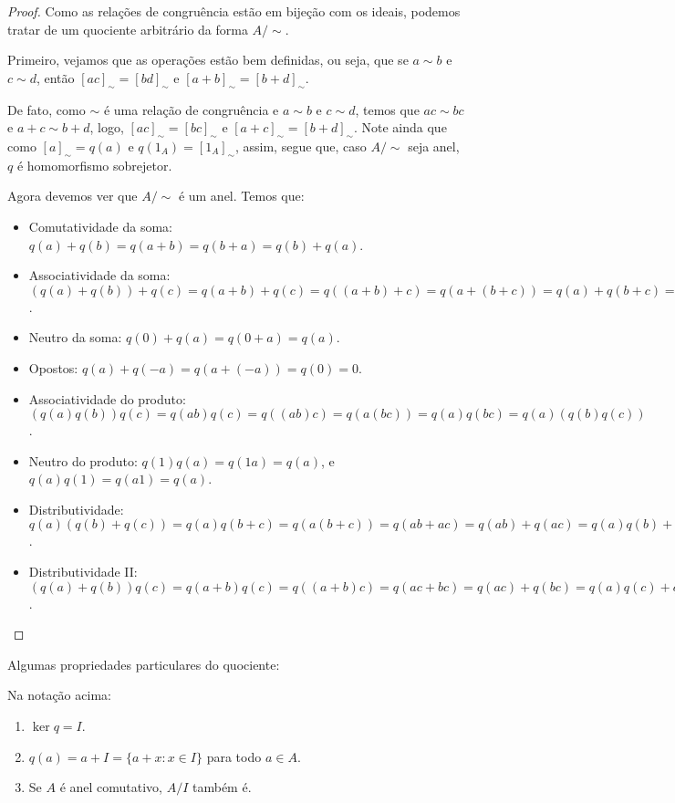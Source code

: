 \begin{proof}
    Como as relações de congruência estão em bijeção com os ideais, podemos tratar de um quociente arbitrário da forma $A/\sim$.
    
    Primeiro, vejamos que as operações estão bem definidas, ou seja, que se $a\sim b$ e $c\sim d$, então $[ac]_\sim=[bd]_\sim$ e $[a+b]_\sim=[b+d]_\sim$.
    
    De fato, como $\sim$ é uma relação de congruência e $a\sim b$ e $c\sim d$, temos que $ac\sim bc$ e $a+c\sim b+d$, logo, $[ac]_\sim=[bc]_\sim$ e $[a+c]_\sim=[b+d]_\sim$. Note ainda que como $[a]_\sim=q(a)$ e $q(1_A)=[1_A]_\sim$, assim, segue que, caso $A/\sim$ seja anel, $q$ é homomorfismo sobrejetor.

    Agora devemos ver que $A/\sim$ é um anel. Temos que:

    \begin{itemize}
        \item Comutatividade da soma: $q(a)+q(b)=q(a+b)=q(b+a)=q(b)+q(a)$.
        \item Associatividade da soma: $(q(a)+q(b))+q(c)=q(a+b)+q(c)=q((a+b)+c)=q(a+(b+c))=q(a)+q(b+c)=q(a)+(q(b)+q(c))$.
        \item Neutro da soma: $q(0)+q(a)=q(0+a)=q(a)$.
        \item Opostos: $q(a)+q(-a)=q(a+(-a))=q(0)=0$.
        \item Associatividade do produto:$(q(a)q(b))q(c)=q(ab)q(c)=q((ab)c)=q(a(bc))=q(a)q(bc)=q(a)(q(b)q(c))$.
        \item Neutro do produto: $q(1)q(a)=q(1a)=q(a)$, e $q(a)q(1)=q(a1)=q(a)$.
        \item Distributividade: $q(a)(q(b)+q(c))=q(a)q(b+c)=q(a(b+c))=q(ab+ac)=q(ab)+q(ac)=q(a)q(b)+q(a)q(c)$.
        \item Distributividade II: $(q(a)+q(b))q(c)=q(a+b)q(c)=q((a+b)c)=q(ac+bc)=q(ac)+q(bc)=q(a)q(c)+q(b)q(c)$.
    \end{itemize}
        
\end{proof}

Algumas propriedades particulares do quociente:

\begin{lemma}
    Na notação acima:
    \begin{enumerate}[label=\alph*)]
        \item $\ker q = I$. \label{lemma:propriedadesQuociente_a}
        \item $q(a)=a+I=\{a+x: x \in I\}$ para todo $a \in A$. \label{lemma:propriedadesQuociente_b}
        \item Se $A$ é anel comutativo, $A/I$ também é. \label{lemma:propriedadesQuociente_c}
    \end{enumerate}
\end{lemma}

